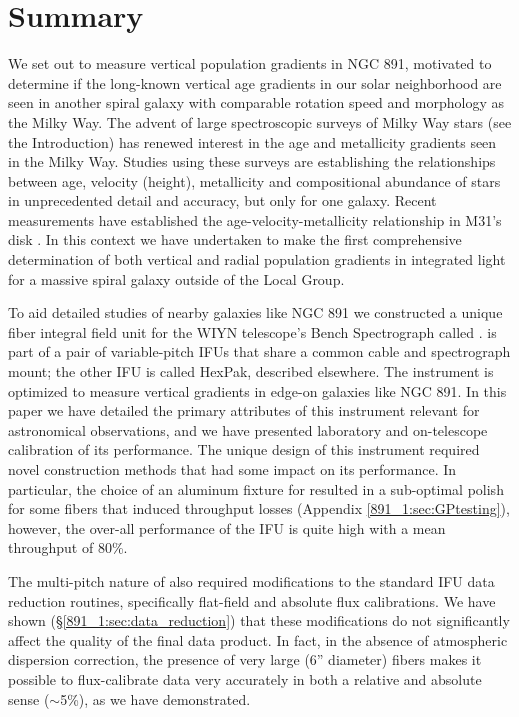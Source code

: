 \section{Summary}
\label{891_1:sec:summary}

We set out to measure vertical population gradients in NGC 891,
motivated to determine if the long-known vertical age gradients in our
solar neighborhood are seen in another spiral galaxy with comparable
rotation speed and morphology as the Milky Way.  The advent of large
spectroscopic surveys of Milky Way stars (see the Introduction) has
renewed interest in the age and metallicity gradients seen in the
Milky Way. Studies using these surveys
\citep[e.g.,][]{Bovy12c,Hayden14,Hayden15} are establishing the
relationships between age, velocity (height), metallicity and
compositional abundance of stars in unprecedented detail and accuracy,
but only for one galaxy.  Recent measurements have established the
age-velocity-metallicity relationship in M31's disk
\citep{Dorman15}. In this context we have undertaken to make the first
comprehensive determination of both vertical and radial population
gradients in integrated light for a massive spiral galaxy outside of
the Local Group.

To aid detailed studies of nearby galaxies like NGC 891 we constructed
a unique fiber integral field unit for the WIYN telescope's Bench
Spectrograph called \GP. \GP is part of a pair of variable-pitch IFUs
that share a common cable and spectrograph mount; the other IFU is
called HexPak, described elsewhere.  The \GP instrument is optimized
to measure vertical gradients in edge-on galaxies like NGC 891. In
this paper we have detailed the primary attributes of this instrument
relevant for astronomical observations, and we have presented
laboratory and on-telescope calibration of its performance.  The
unique design of this instrument required novel construction methods
that had some impact on its performance. In particular, the choice of
an aluminum fixture for \GP resulted in a sub-optimal polish for some
fibers that induced throughput losses (Appendix \ref{891_1:sec:GPtesting}),
however, the over-all performance of the IFU is quite high with a mean
throughput of 80\%.

The multi-pitch nature of \GP also required modifications to the
standard IFU data reduction routines, specifically flat-field and
absolute flux calibrations. We have shown (\S\ref{891_1:sec:data_reduction})
that these modifications do not significantly affect the quality of
the final data product. In fact, in the absence of atmospheric
dispersion correction, the presence of very large (6'' diameter)
fibers makes it possible to flux-calibrate \GP data very accurately in
both a relative and absolute sense ($\sim$5\%), as we have
demonstrated.

